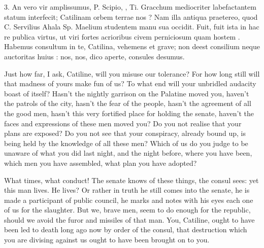{  3. An vero vir amplissumus, P. Scipio, , Ti. Gracchum mediocriter labefactantem statum   interfecit; Catilinam orbem terrae    nos  ? Nam illa  antiqua praetereo, quod C. Servilius Ahala Sp. Maelium  studentem manu sua occidit. Fuit, fuit ista  in hac re publica virtus, ut viri fortes acrioribus  civem perniciosum quam  hostem . Habemus  consultum in te, Catilina, vehemens et grave; non deest  consilium neque auctoritas huius : nos, nos, dico aperte, consules desumus.
}{
  Just how far, I ask, Catiline, will you misuse our tolerance? For how long still will that madness of yours make fun of us? To what end will your unbridled audacity boast of itself? Hasn’t the nightly garrison on the Palatine moved you, haven’t the patrols of the city, hasn’t the fear of the people, hasn’t the agreement of all the good men, hasn’t this very fortified place for holding the senate, haven’t the faces and expressions of these men moved you? Do you not realise that your plans are exposed? Do you not see that your conspiracy, already bound up, is being held by the knowledge of all these men? Which of us do you judge to be unaware of what you did last night, and the night before, where you have been, which men you have assembled, what plan you have adopted?

  What times, what conduct! The senate knows of these things, the consul sees: yet this man lives. He lives? Or rather in truth he still comes into the senate, he is made a participant of public council, he marks and notes with his eyes each one of us for the slaughter. But we, brave men, seem to do enough for the republic, should we avoid the furor and missiles of that man. You, Catiline, ought to have been led to death long ago now by order of the consul, that destruction which you are divising against us ought to have been brought on to you.

}
